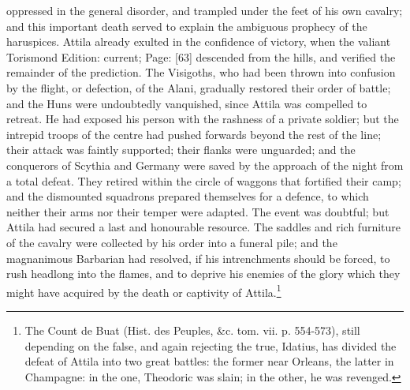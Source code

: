 oppressed in the general disorder, and trampled under the feet of his own cavalry; and this important death served to explain the ambiguous prophecy of the haruspices. Attila already exulted in the confidence of victory, when the valiant Torismond Edition: current; Page: [63] descended from the hills, and verified the remainder of the prediction. The Visigoths, who had been thrown into confusion by the flight, or defection, of the Alani, gradually restored their order of battle; and the Huns were undoubtedly vanquished, since Attila was compelled to retreat. He had exposed his person with the rashness of a private soldier; but the intrepid troops of the centre had pushed forwards beyond the rest of the line; their attack was faintly supported; their flanks were unguarded; and the conquerors of Scythia and Germany were saved by the approach of the night from a total defeat. They retired within the circle of waggons that fortified their camp; and the dismounted squadrons prepared themselves for a defence, to which neither their arms nor their temper were adapted. The event was doubtful; but Attila had secured a last and honourable resource. The saddles and rich furniture of the cavalry were collected by his order into a funeral pile; and the magnanimous Barbarian had resolved, if his intrenchments should be forced, to rush headlong into the flames, and to deprive his enemies of the glory which they might have acquired by the death or captivity of Attila.\footnote{The Count de Buat (Hist. des Peuples, \&c. tom. vii. p. 554-573), still depending on the false, and again rejecting the true, Idatius, has divided the defeat of Attila into two great battles: the former near Orleans, the latter in Champagne: in the one, Theodoric was slain; in the other, he was revenged.}

